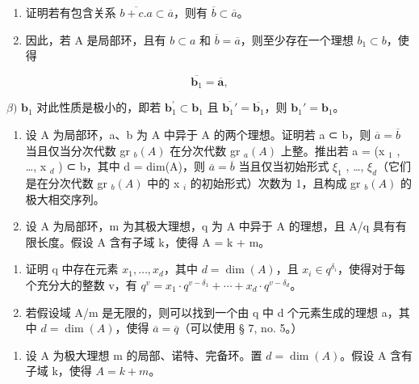 \begin{enumerate}
\def\labelenumi{\alph{enumi})}
\item
  证明若有包含关系 \(\overline{b + c.a} \subset \overline{a}\)，则有 \(\overline{b} \subset \overline{a}\)。
\item
  因此，若 A 是局部环，且有 \(b \subset a\) 和 \(\overline{b} = \overline{a}\)，则至少存在一个理想 \(b_{1} \subset b\)，使得
\end{enumerate}

\[
\overline {{{\mathbf {b} _ {1}}}} = \overline {{{\mathbf {a}}}},
\]

\(\beta)\) \(\mathbf{b}_{1}\) 对此性质是极小的，即若 \(\mathbf{b}_{1}^{\prime}\subset \mathbf{b}_{1}\) 且 \(\overline{\mathbf{b}_1'} = \overline{\mathbf{b}_1}\)，则 \(\mathbf{b}_1' = \mathbf{b}_1\)。

\begin{enumerate}
\def\labelenumi{\arabic{enumi})}
\setcounter{enumi}{12}
\item
  设 A 为局部环，a、b 为 A 中异于 A 的两个理想。证明若 a ⊂ b，则 \(\overline{a} = \overline{b}\) 当且仅当分次代数 gr \(_b(A)\) 在分次代数 gr \(_a(A)\) 上整。推出若 a = (x \(_1\) , \ldots, x \(_d\) ) ⊂ b，其中 d = dim(A)，则 \(\overline{a} = \overline{b}\) 当且仅当初始形式 \(\xi_{1}\) , \ldots, \(\xi_{d}\)（它们是在分次代数 gr \(_b(A)\) 中的 x \(_i\) 的初始形式）次数为 1，且构成 gr \(_b(A)\) 的极大相交序列。
\item
  设 A 为局部环，m 为其极大理想，q 为 A 中异于 A 的理想，且 A/q 具有有限长度。假设 A 含有子域 k，使得 A = k + m。
\end{enumerate}

\begin{enumerate}
\def\labelenumi{\alph{enumi})}
\tightlist
\item
  证明 q 中存在元素 \(x_{1}, \ldots, x_{d}\)，其中 \(d = \dim(A)\)，且 \(x_{i} \in q^{\delta_{i}}\)，使得对于每个充分大的整数 v，有 \(q^{v} = x_{1} \cdot q^{v - \delta_{1}} + \cdots + x_{d} \cdot q^{v - \delta_{d}}\)。
\item
  若假设域 A/m 是无限的，则可以找到一个由 q 中 d 个元素生成的理想 a，其中 \(d = \dim(A)\)，使得 \(\overline{a} = \overline{q}\)（可以使用 § 7, no. 5。）
\end{enumerate}

\begin{enumerate}
\def\labelenumi{\arabic{enumi})}
\setcounter{enumi}{14}
\tightlist
\item
  设 A 为极大理想 m 的局部、诺特、完备环。置 \(d = \dim(A)\)。假设 A 含有子域 k，使得 \(A = k + m\)。
\end{enumerate}

